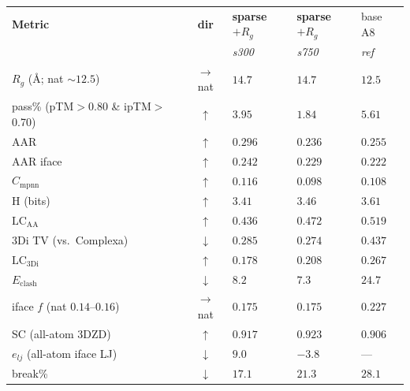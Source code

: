 \documentclass[11pt]{article}
\begin{document}
\begin{table}[htbp]
\centering
\footnotesize
\setlength{\tabcolsep}{6pt}
{\renewcommand{\arraystretch}{1.2}%
\begin{tabular}{@{}>{\raggedright\arraybackslash}p{5.2cm}
                    c
                    >{\centering\arraybackslash}p{2.0cm}
                    >{\centering\arraybackslash}p{2.0cm}
                    >{\centering\arraybackslash}p{1.4cm}@{}}
\toprule
\textbf{Metric} & \textbf{dir} & \textbf{sparse$+R_g$} & \textbf{sparse$+R_g$} & base A8\\
 & & \emph{s300} & \emph{s750} & \emph{ref}\\
\midrule
\rowcolor{aTint}$R_g$ (\AA; nat $\sim\!12.5$)  & $\to$nat     & $14.7$ & $14.7$ & $12.5$\\
\midrule
pass\% (pTM$>$0.80 \& ipTM$>$0.70)             & $\uparrow$   & $\mathbf{3.95}$ & $1.84$ & $5.61$\\
AAR                                            & $\uparrow$   & $\mathbf{0.296}$ & $0.236$ & $0.255$\\
AAR iface                                      & $\uparrow$   & $\mathbf{0.242}$ & $0.229$ & $0.222$\\
$C_{\mathrm{mpnn}}$                            & $\uparrow$   & $\mathbf{0.116}$ & $0.098$ & $0.108$\\
H (bits)                                       & $\uparrow$   & $3.41$ & $\mathbf{3.46}$ & $3.61$\\
$\mathrm{LC}_{\mathrm{AA}}$                    & $\uparrow$   & $0.436$ & $\mathbf{0.472}$ & $0.519$\\
3Di TV (vs.\ Complexa)                         & $\downarrow$ & $0.285$ & $\mathbf{0.274}$ & $0.437$\\
$\mathrm{LC}_{\mathrm{3Di}}$                   & $\uparrow$   & $0.178$ & $\mathbf{0.208}$ & $0.267$\\
$E_{\mathrm{clash}}$                           & $\downarrow$ & $8.2$ & $\mathbf{7.3}$ & $24.7$\\
iface $f$ (nat $0.14$--$0.16$)                 & $\to$nat     & $0.175$ & $0.175$ & $0.227$\\
SC (all-atom 3DZD)                             & $\uparrow$   & $0.917$ & $\mathbf{0.923}$ & $0.906$\\
$e_{lj}$ (all-atom iface LJ)                   & $\downarrow$ & $9.0$ & $\mathbf{-3.8}$ & ---\\
break\%                                        & $\downarrow$ & $\mathbf{17.1}$ & $21.3$ & $28.1$\\

\end{tabular}}
\end{table}
\end{document}
